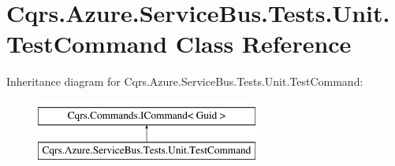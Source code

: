 \hypertarget{classCqrs_1_1Azure_1_1ServiceBus_1_1Tests_1_1Unit_1_1TestCommand}{}\section{Cqrs.\+Azure.\+Service\+Bus.\+Tests.\+Unit.\+Test\+Command Class Reference}
\label{classCqrs_1_1Azure_1_1ServiceBus_1_1Tests_1_1Unit_1_1TestCommand}
Inheritance diagram for Cqrs.\+Azure.\+Service\+Bus.\+Tests.\+Unit.\+Test\+Command\+:\begin{figure}[H]
\begin{center}
\leavevmode
\includegraphics[height=2.000000cm]{classCqrs_1_1Azure_1_1ServiceBus_1_1Tests_1_1Unit_1_1TestCommand}
\end{center}
\end{figure}
